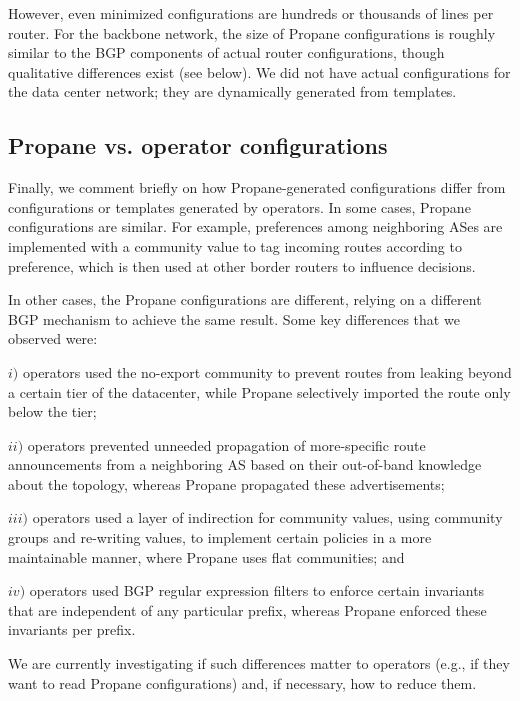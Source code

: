 \documentclass[10pt]{sigalternate052015}
\newcommand{\sysname}{{\small \sf Propane}\xspace}
\begin{document}
However, even minimized configurations are hundreds or thousands of lines per router. For the backbone network, the size of \sysname configurations is roughly similar to the BGP components of actual router configurations, though qualitative differences exist (see below). We did not have actual configurations for the data center network; they are dynamically generated from templates. 


\subsection{Propane vs. operator configurations}

Finally, we comment briefly on how \sysname-generated configurations differ from configurations or templates generated by operators.
%
In some cases, \sysname configurations are similar. For example, preferences among neighboring ASes are implemented with a community value to tag incoming routes according to preference, which is then used at other border routers to influence decisions.

In other cases, the \sysname configurations are different, relying on a different BGP mechanism to achieve the same result. Some key differences that we observed were:

$i)$ operators used the no-export community to prevent routes from leaking beyond a certain tier of the datacenter, while \sysname selectively imported the route only below the tier;

$ii)$ operators prevented unneeded propagation of more-specific route announcements from a neighboring AS based on their out-of-band knowledge about the topology, whereas \sysname propagated these advertisements;

$iii)$ operators used a layer of indirection for community values, using community groups and re-writing values, to implement certain policies in a more maintainable manner, where \sysname uses flat communities; and

$iv)$ operators used BGP regular expression filters to enforce certain invariants that are independent of any particular prefix, whereas \sysname enforced these invariants per prefix.

We are currently investigating if such differences matter to operators (e.g., if they want to read \sysname configurations) and, if necessary, how to reduce them.
\end{document}
